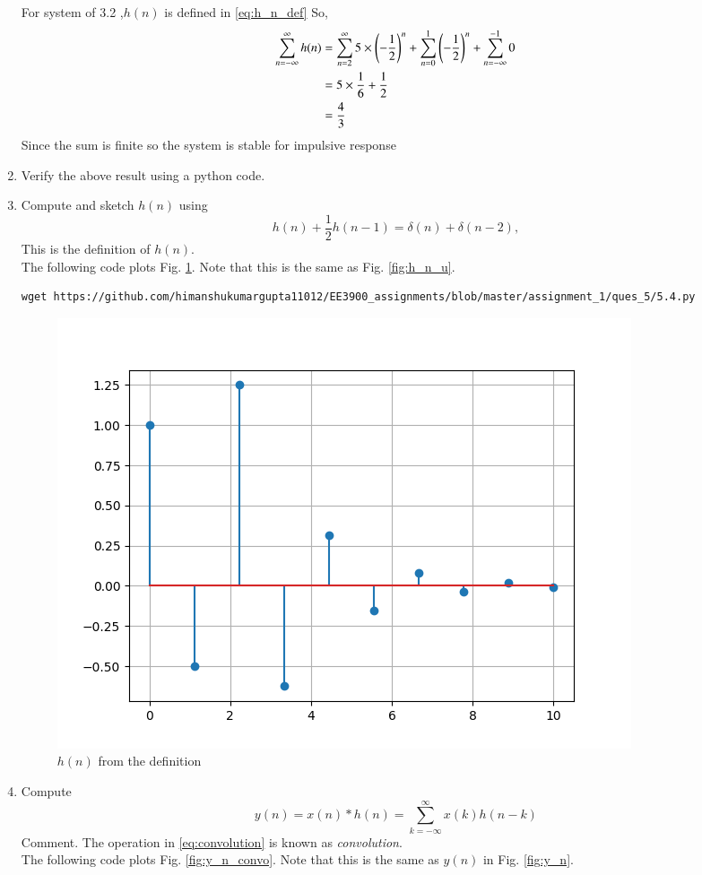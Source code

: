 \documentclass[journal,12pt,twocolumn]{IEEEtran}
\renewcommand\thesection{\arabic{section}}
\begin{document}
\begin{enumerate}[label=\thesection.\arabic*]
\solution For system of 3.2 ,$h(n)$ is defined in \eqref{eq:h_n_def} 
So,
\begin{align}
	\sum_{n=-\infty}^{\infty}h(n)&=\sum_{n=2}^{\infty}5\times \left(-\frac{1}{2}\right)^n+\sum_{n=0}^{1} \left(-\frac{1}{2}\right)^n+\sum_{n=-\infty}^{-1}0\\
	&=5\times \frac{1}{6}+\frac{1}{2}\\
	&=\frac{4}{3}
\end{align}
Since the sum is finite so the system is stable for impulsive response
\item Verify the above result using a python code.
\item 
Compute and sketch $h(n)$ using 
\begin{equation}
\label{eq:iir_filter_h}
h(n) + \frac{1}{2}h(n-1) = \delta(n) + \delta(n-2), 
\end{equation}
%
This is the definition of $h(n)$.
\\
\solution The following code plots Fig. \ref{fig:h_n_delta}. Note that this is the same as Fig. 
\ref{fig:h_n_u}. 
%
\begin{lstlisting}
wget https://github.com/himanshukumargupta11012/EE3900_assignments/blob/master/assignment_1/ques_5/5.4.py
\end{lstlisting}
\begin{figure}[!ht]
\centering
\includegraphics[width=\columnwidth]{./ques_5/h_delta}
\caption{$h(n)$ from the definition}
\label{fig:h_n_delta}
\end{figure}
%
\item Compute 
%
\begin{equation}
\label{eq:convolution}
y(n) = x(n)*h(n) = \sum_{k=-\infty}^{\infty}x(k)h(n-k)
\end{equation}
%
Comment. The operation in \eqref{eq:convolution} is known as
{\em convolution}.
%
\\
\solution The following code plots Fig. \ref{fig:y_n_convo}. Note that this is the same as 
$y(n)$ in  Fig. 
\ref{fig:y_n}. 



\end{enumerate}
\end{document}
